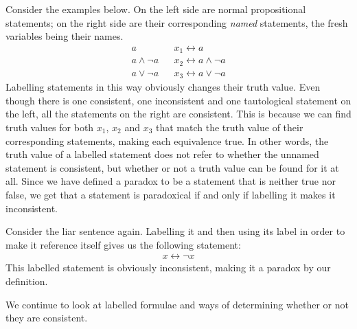 Consider the examples below.
On the left side are normal propositional statements;
on the right side are their corresponding \textit{named} statements, the fresh variables being their names.
\begin{align}
  a               && x_1 \leftrightarrow a\\
  a \wedge \neg a && x_2 \leftrightarrow a \wedge \neg a\\
  a \vee \neg a   && x_3 \leftrightarrow a \vee \neg a
\end{align}
Labelling statements in this way obviously changes their truth value.
Even though there is one consistent, one inconsistent and one tautological statement on the left, all the statements on the right are consistent.
This is because we can find truth values for both $x_1$, $x_2$ and $x_3$ that match the truth value of their corresponding statements, making each equivalence true.
In other words, the truth value of a labelled statement does not refer to whether the unnamed statement is consistent, but whether or not a truth value can be found for it at all.
Since we have defined a paradox to be a statement that is neither true nor false, we get that a statement is paradoxical if and only if labelling it makes it inconsistent.

Consider the liar sentence again.
Labelling it and then using its label in order to make it reference itself gives us the following statement:
\begin{align}
  x \leftrightarrow \neg x
\end{align}
This labelled statement is obviously inconsistent, making it a paradox by our definition.

We continue to look at labelled formulae and ways of determining whether or not they are consistent.
